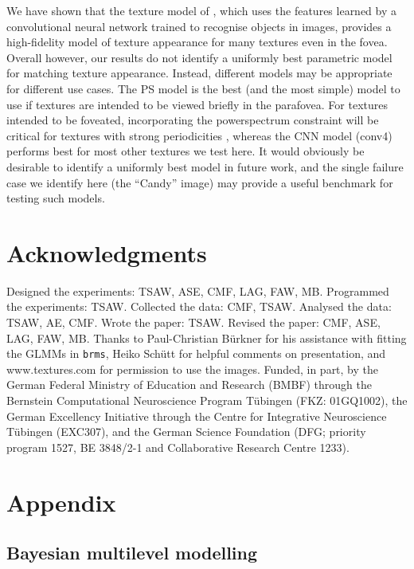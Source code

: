 \documentclass[article, 11pt,a4paper,natbib]{apa6}\usepackage[]{graphicx}\usepackage[]{color}
\begin{document}
We have shown that the texture model of \citet{gatys_texture_2015-1}, which uses the features learned by a convolutional neural network trained to recognise objects in images, provides a high-fidelity model of texture appearance for many textures even in the fovea.
Overall however, our results do not identify a uniformly best parametric model for matching texture appearance.
Instead, different models may be appropriate for different use cases.
The PS model is the best (and the most simple) model to use if textures are intended to be viewed briefly in the parafovea.
For textures intended to be foveated, incorporating the powerspectrum constraint will be critical for textures with strong periodicities \citep{liu_texture_2016}, whereas the CNN model (conv4) performs best for most other textures we test here.
It would obviously be desirable to identify a uniformly best model in future work, and the single failure case we identify here (the ``Candy'' image) may provide a useful benchmark for testing such models.


\section{Acknowledgments}

Designed the experiments: TSAW, ASE, CMF, LAG, FAW, MB.
Programmed the experiments: TSAW.
Collected the data: CMF, TSAW.
Analysed the data: TSAW, AE, CMF.
Wrote the paper: TSAW.
Revised the paper: CMF, ASE, LAG, FAW, MB.
Thanks to Paul-Christian B\"{u}rkner for his assistance with fitting the GLMMs in \texttt{brms}, Heiko Sch\"{u}tt for helpful comments on presentation, and www.textures.com for permission to use the images.
Funded, in part, by the German Federal Ministry of Education and Research (BMBF) through the Bernstein Computational Neuroscience Program T\"{u}bingen (FKZ: 01GQ1002),
the German Excellency Initiative through the Centre for Integrative Neuroscience T\"{u}bingen (EXC307), 
and the German Science Foundation (DFG; priority program 1527, BE 3848/2-1 and Collaborative Research Centre 1233).

\newpage
\section{Appendix}

\subsection{Bayesian multilevel modelling}
\end{document}
